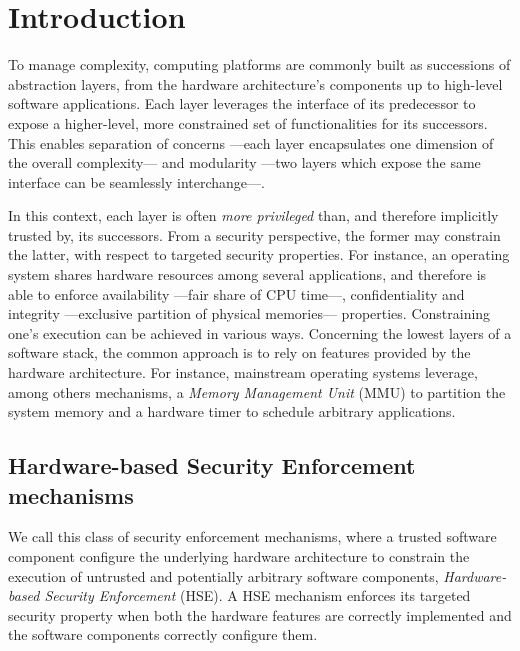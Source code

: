 \chapter{Introduction}


\vspace{1cm}\noindent To manage complexity, computing platforms are commonly
built as successions of abstraction layers, from the hardware architecture's
components up to high-level software applications.
%
Each layer leverages the interface of its predecessor to expose a higher-level,
more constrained set of functionalities for its successors.
%
This enables separation of concerns ---each layer encapsulates one dimension of
the overall complexity--- and modularity ---two layers which expose the same
interface can be seamlessly interchange---.


In this context, each layer is often \emph{more privileged} than, and therefore
implicitly trusted by, its successors.
%
From a security perspective, the former may constrain the latter, with respect
to targeted security properties.
%
For instance, an operating system shares hardware resources among several
applications, and therefore is able to enforce availability ---fair share of CPU
time---, confidentiality and integrity ---exclusive partition of physical
memories--- properties.
%
Constraining one's execution can be achieved in various ways.
%
Concerning the lowest layers of a software stack, the common approach is to rely
on features provided by the hardware architecture.
%
For instance, mainstream operating systems leverage, among others mechanisms, a
\emph{Memory Management Unit} (MMU) to partition the system memory and a
hardware timer to schedule arbitrary applications.

\section{Hardware-based Security Enforcement mechanisms}

We call this class of security enforcement mechanisms, where a trusted software
component configure the underlying hardware architecture to constrain the
execution of untrusted and potentially arbitrary software components,
\emph{Hardware-based Security Enforcement} (HSE).
%
A HSE mechanism enforces its targeted security property when both the hardware
features are correctly implemented and the software components correctly
configure them.

